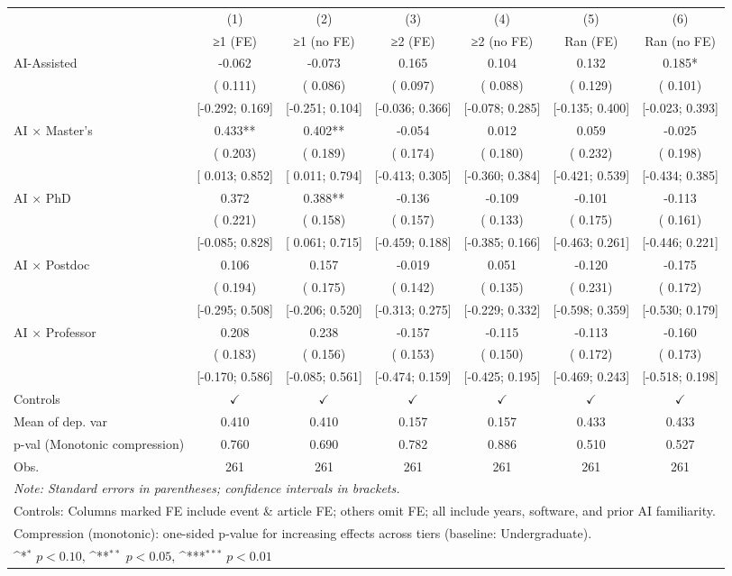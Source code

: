 \def\sym#1{\ifmmode^{#1}\else\(^{#1}\)\fi}
\begin{tabular}{l*{6}{c}}
\hline\hline
 & (1) & (2) & (3) & (4) & (5) & (6)
\\
 & ≥1 (FE) & ≥1 (no FE) & ≥2 (FE) & ≥2 (no FE) & Ran (FE) & Ran (no FE)
 \\
\hline
AI-Assisted & -0.062 & -0.073 &  0.165 &  0.104 &  0.132 &  0.185*
\\
 & ( 0.111) & ( 0.086) & ( 0.097) & ( 0.088) & ( 0.129) & ( 0.101)
\\
 & [-0.292;  0.169] & [-0.251;  0.104] & [-0.036;  0.366] & [-0.078;  0.285] & [-0.135;  0.400] & [-0.023;  0.393]
\\
AI × Master's &  0.433** &  0.402** & -0.054 &  0.012 &  0.059 & -0.025
\\
 & ( 0.203) & ( 0.189) & ( 0.174) & ( 0.180) & ( 0.232) & ( 0.198)
\\
 & [ 0.013;  0.852] & [ 0.011;  0.794] & [-0.413;  0.305] & [-0.360;  0.384] & [-0.421;  0.539] & [-0.434;  0.385]
\\
AI × PhD &  0.372 &  0.388** & -0.136 & -0.109 & -0.101 & -0.113
\\
 & ( 0.221) & ( 0.158) & ( 0.157) & ( 0.133) & ( 0.175) & ( 0.161)
\\
 & [-0.085;  0.828] & [ 0.061;  0.715] & [-0.459;  0.188] & [-0.385;  0.166] & [-0.463;  0.261] & [-0.446;  0.221]
\\
AI × Postdoc &  0.106 &  0.157 & -0.019 &  0.051 & -0.120 & -0.175
\\
 & ( 0.194) & ( 0.175) & ( 0.142) & ( 0.135) & ( 0.231) & ( 0.172)
\\
 & [-0.295;  0.508] & [-0.206;  0.520] & [-0.313;  0.275] & [-0.229;  0.332] & [-0.598;  0.359] & [-0.530;  0.179]
\\
AI × Professor &  0.208 &  0.238 & -0.157 & -0.115 & -0.113 & -0.160
\\
 & ( 0.183) & ( 0.156) & ( 0.153) & ( 0.150) & ( 0.172) & ( 0.173)
\\
 & [-0.170;  0.586] & [-0.085;  0.561] & [-0.474;  0.159] & [-0.425;  0.195] & [-0.469;  0.243] & [-0.518;  0.198]
\\
\hline
Controls & $\checkmark$ & $\checkmark$ & $\checkmark$ & $\checkmark$ & $\checkmark$ & $\checkmark$
\\
Mean of dep. var &  0.410 &  0.410 &  0.157 &  0.157 &  0.433 &  0.433
\\
p-val (Monotonic compression) &  0.760 &  0.690 &  0.782 &  0.886 &  0.510 &  0.527
\\
Obs. & 261 & 261 & 261 & 261 & 261 & 261
\\
\hline
\hline\hline
\multicolumn{7}{l}{\it{Note:} Standard errors in parentheses; confidence intervals in brackets.}\\
\multicolumn{7}{l}{Controls: Columns marked FE include event \& article FE; others omit FE; all include years, software, and prior AI familiarity.}\\
\multicolumn{7}{l}{Compression (monotonic): one-sided p-value for increasing effects across tiers (baseline: Undergraduate).}\\
\multicolumn{7}{l}{\sym{*} $p<0.10$, \sym{**} $p<0.05$,  \sym{***} $p<0.01$}\\
\end{tabular}
